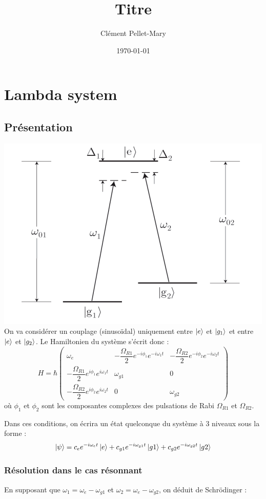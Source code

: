 \documentclass[a4paper]{report}
\title{Titre}
\author{Clément Pellet-Mary}
\date\today
\begin{document}
\chapter{Lambda system}
  \section{Présentation}
  \includegraphics[width=\textwidth]{lambdasystem}
  On va considérer un couplage (sinusoïdal) uniquement entre $\ket{e}$ et $\ket{g_1}$ et entre $\ket{e}$ et $\ket{g_2}$. Le Hamiltonien du système s'écrit donc :
  \begin{equation}
  H=\hbar \begin{pmatrix}
  \omega_e & -\dfrac{\Omega_{R1}}{2}e^{-i\phi_1}e^{-i\omega_1t} & -\dfrac{\Omega_{R2}}{2}e^{-i\phi_2}e^{-i\omega_2t} \\
  -\dfrac{\Omega_{R1}}{2}e^{i\phi_1}e^{i\omega_1t} & \omega_{g1} & 0 \\
  -\dfrac{\Omega_{R2}}{2}e^{i\phi_2}e^{i\omega_2t} & 0 & \omega_{g2}
  \end{pmatrix}
  \end{equation}
  où $\phi_1$ et $\phi_2$ sont les composantes complexes des pulsations de Rabi $\Omega_{R1}$ et $\Omega_{R2}$.
  
  Dans ces conditions, on écrira un état quelconque du système à 3 niveaux sous la forme : 
  \begin{equation}
  \ket{\psi}=c_e e^{-i\omega_et} \ket{e} + c_{g1} e^{-i\omega_{g1}t} \ket{g1} + c_{g2} e^{-i\omega_{g2}t} \ket{g2}
  \end{equation}
  \subsection{Résolution dans le cas résonnant}
  En supposant que $\omega_1 = \omega_e - \omega_{g1}$ et $\omega_2 = \omega_e - \omega_{g2}$, on déduit de Schrödinger : 
\end{document}
